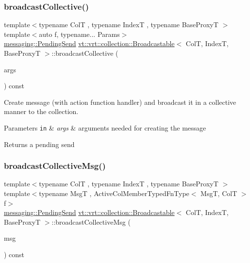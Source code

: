 \subsubsection{\texorpdfstring{broadcast\+Collective()}{broadcastCollective()}\hspace{0.1cm}{\footnotesize\ttfamily [3/3]}}
{\footnotesize\ttfamily template$<$typename ColT , typename IndexT , typename Base\+ProxyT $>$ \\
template$<$auto f, typename... Params$>$ \\
\hyperlink{structvt_1_1messaging_1_1_pending_send}{messaging\+::\+Pending\+Send} \hyperlink{structvt_1_1vrt_1_1collection_1_1_broadcastable}{vt\+::vrt\+::collection\+::\+Broadcastable}$<$ ColT, IndexT, Base\+ProxyT $>$\+::broadcast\+Collective (\begin{DoxyParamCaption}\item[{Params \&\&...}]{args }\end{DoxyParamCaption}) const}



Create message (with action function handler) and broadcast it in a collective manner to the collection. 


\begin{DoxyParams}[1]{Parameters}
\mbox{\tt in}  & {\em args} & arguments needed for creating the message\\
\hline
\end{DoxyParams}
\begin{DoxyReturn}{Returns}
a pending send 
\end{DoxyReturn}
\mbox{\label{structvt_1_1vrt_1_1collection_1_1_broadcastable_a70ec0f06ef5566c713a4d960a8faa39b}} 
\subsubsection{\texorpdfstring{broadcast\+Collective\+Msg()}{broadcastCollectiveMsg()}\hspace{0.1cm}{\footnotesize\ttfamily [1/3]}}
{\footnotesize\ttfamily template$<$typename ColT , typename IndexT , typename Base\+ProxyT $>$ \\
template$<$typename MsgT , Active\+Col\+Member\+Typed\+Fn\+Type$<$ Msg\+T, Col\+T $>$ f$>$ \\
\hyperlink{structvt_1_1messaging_1_1_pending_send}{messaging\+::\+Pending\+Send} \hyperlink{structvt_1_1vrt_1_1collection_1_1_broadcastable}{vt\+::vrt\+::collection\+::\+Broadcastable}$<$ ColT, IndexT, Base\+ProxyT $>$\+::broadcast\+Collective\+Msg (\begin{DoxyParamCaption}\item[{\hyperlink{structvt_1_1messaging_1_1_msg_ptr_thief}{messaging\+::\+Msg\+Ptr\+Thief}$<$ MsgT $>$}]{msg }\end{DoxyParamCaption}) const}



